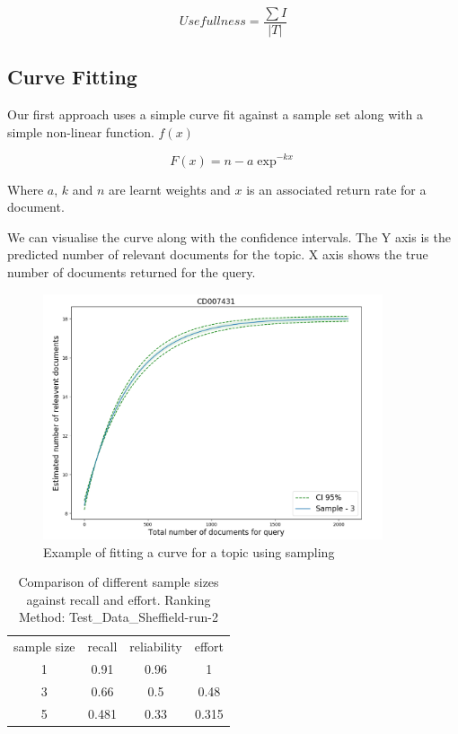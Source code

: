 \begin{equation}
Usefullness = \frac{\sum{I}}{|T|}
\end{equation}



\subsection{Curve Fitting}

Our first approach uses a simple curve fit against a sample set along with a simple non-linear function. $f(x)$

\begin{equation}
F(x) = n - a\exp^{-kx}
\end{equation}

Where $a$, $k$ and $n$ are learnt weights and $x$ is an associated return rate for a document.

We can visualise the curve along with the confidence intervals. The Y axis is the predicted number of relevant documents for the topic. X axis shows the true number of documents returned for the query. 

\begin{figure}[H]
\center
\includegraphics[width=10cm]{figures/curve_fit_example.png}
\caption{Example of fitting a curve for a topic using sampling}
\end{figure}

\begin{table}[H]
\centering
\begin{tabular}{|c|c|c|c|} 

 \hline
 sample size & recall & reliability & effort  \\ 
 1 & 0.91 &	0.96	&	1 \\ 
 3 & 0.66 & 0.5	&	0.48 \\ 
 5 & 0.481 & 0.33	&	0.315 \\ 
 \hline
\end{tabular}
\caption{Comparison of different sample sizes against recall and effort. Ranking Method: Test\_Data\_Sheffield-run-2 \cite{Alharbi2017}}

\end{table}

